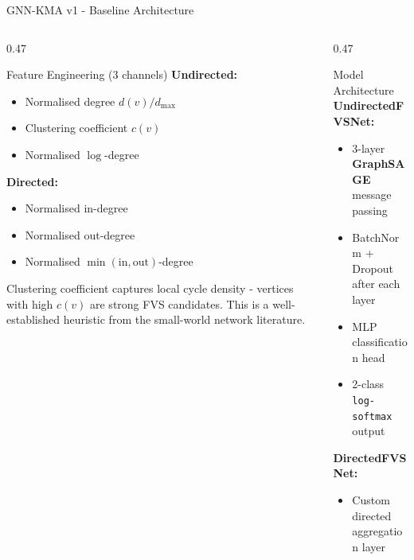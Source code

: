 \documentclass[aspectratio=169]{beamer}
\renewcommand{\footnotesize}{\tiny}
\begin{document}
\begin{frame}{GNN-KMA v1 - Baseline Architecture}
	\tiny
	\begin{columns}[T]
		\begin{column}{0.47\textwidth}
			\begin{block}{Feature Engineering (3 channels)}
				\textbf{Undirected:}
				\begin{itemize}
					\item Normalised degree $d(v)/d_{\max}$
					\item Clustering coefficient $c(v)$ \cite{watts1998}
					\item Normalised $\log$-degree
				\end{itemize}
				\textbf{Directed:}
				\begin{itemize}
					\item Normalised in-degree
					\item Normalised out-degree
					\item Normalised $\min(\text{in},\text{out})$-degree
				\end{itemize}
			\end{block}
			\vspace{4pt}
			\begin{tcolorbox}[algbox,title=Design Choice]
				\footnotesize
				Clustering coefficient \cite{watts1998} captures local cycle density -
				vertices with high $c(v)$ are strong FVS candidates.
				This is a well-established heuristic from the
				small-world network literature.
			\end{tcolorbox}
		\end{column}
		\begin{column}{0.47\textwidth}
			\begin{block}{Model Architecture}
				\textbf{UndirectedFVSNet:}
				\begin{itemize}
					\item 3-layer \textbf{GraphSAGE} message passing \cite{hamilton2017}
					\item BatchNorm + Dropout after each layer
					\item MLP classification head
					\item 2-class \texttt{log-softmax} output
				\end{itemize}
				\textbf{DirectedFVSNet:}
				\begin{itemize}
					\item Custom directed aggregation layer\\

\end{itemize}
\end{block}
\end{column}
\end{columns}
\end{frame}
\end{document}
